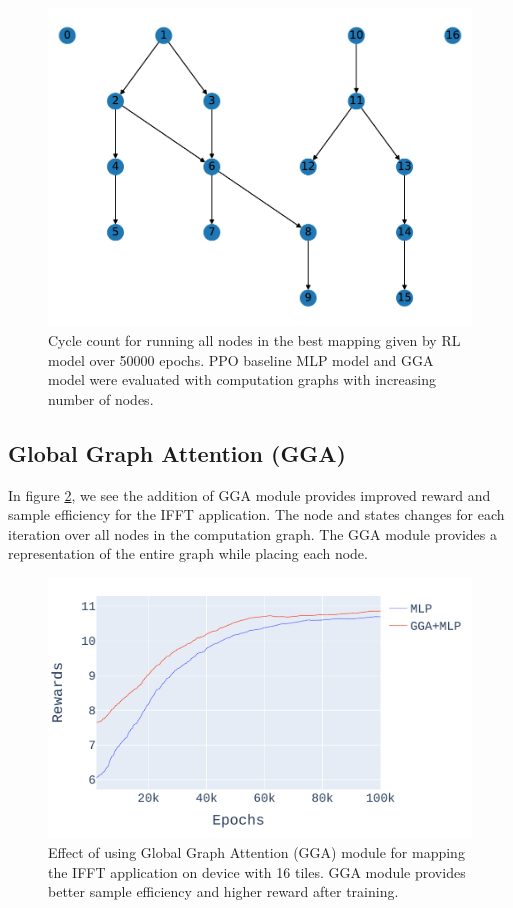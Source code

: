 \begin{figure}[h]
  \centering
  \includegraphics[scale=0.4]{fig/ifft_graph.pdf}
  \caption{Cycle count for running all nodes in the best mapping given by RL model over 50000 epochs. 
  PPO baseline MLP model and GGA model were evaluated with computation graphs with increasing number of nodes. }
  \label{fig:nodes_graph}
\end{figure}


\subsection{Global Graph Attention (GGA)}

In figure \ref{fig:ifft_rewards}, we see the addition of GGA module provides improved reward and sample efficiency for the IFFT application. 
The node and states changes for each iteration over all nodes in the computation graph. The GGA module provides 
a representation of the entire graph while placing each node.

\begin{figure}[h]
  \centering
  \includegraphics[width=\linewidth]{fig/plot_gnn_atten_ppo.pdf}
  \caption{Effect of using Global Graph Attention (GGA) module for mapping the IFFT application on device with 16 tiles. 
  GGA module provides better sample efficiency and higher reward after training. }
  \label{fig:ifft_rewards}
\end{figure}


